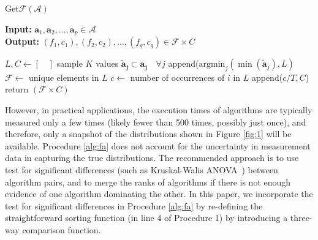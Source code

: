 \documentclass[conference]{IEEEtran}
\newcommand{\p}[1]{{\color{blue} Pdj: #1}}
\begin{document}
\begin{algorithm}
	\caption{ Get$\mathcal{F}$$(\mathcal{A})$ }
	\label{alg:fa}
	\hspace*{\algorithmicindent} \textbf{Input: } $ \mathbf{a}_1,\mathbf{a}_2 ,..., \mathbf{a}_p\in \mathcal{A}$ \\
	\hspace*{\algorithmicindent} \textbf{Output: } $ (f_1,c_1), (f_2, c_2), ..., (f_q,c_q) \in \mathcal{F} \times C  $
	\begin{algorithmic}[1] 
		\State $L, C \leftarrow [ \quad ]$ 
		\State sample $K$ values $\mathbf{\tilde{a}_{j}} \subset \mathbf{a_j} \quad \forall j$  
		\State append($\text{argmin}_j(\min(\mathbf{\tilde{a}}_j ), L)$ 
		\EndFor
		\State $\mathcal{F} \leftarrow $ unique elements in $L$ 
		\State $c \leftarrow$ number of occurrences of $i$ in $L$ 
		\State append($c/T, C$)
		\EndFor
		\State return $(\mathcal{F} \times C)$
        \end{algorithmic}
\end{algorithm}

However, in practical applications, the execution times of algorithms are typically
measured only a few times (likely fewer than 500 times, possibly just once), and therefore, only a snapshot of the distributions
shown in Figure \ref{fig:1} will be available. Procedure \ref{alg:fa} does not account for the uncertainty in measurement data in capturing the true distributions. 
The recommended approach is to use test for significant differences (such as Kruskal-Walis
ANOVA~\cite{hoefler2015scientific}) between algorithm pairs, and to merge the ranks of algorithms if there is not enough
evidence of one algorithm dominating the other. In this paper, we incorporate the test for significant differences in
Procedure \ref{alg:fa} by re-defining the straightforward sorting function (in line 4 of Procedure 1) by introducing a
three-way comparison function. 
\bigskip
\end{document}
